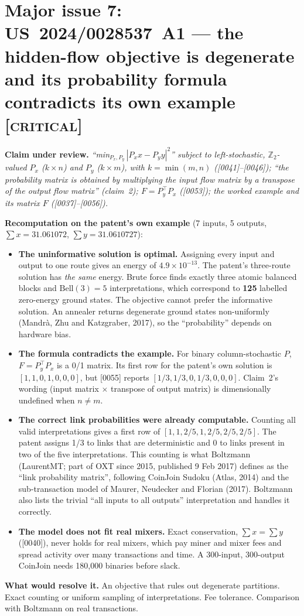 \documentclass[10pt,a4paper]{article}
\newcommand{\claim}[1]{\noindent\textbf{Claim under review.} \emph{#1}\par\smallskip}
\newcommand{\sev}[1]{\textsc{\color{BrickRed}[#1]}}
\newcommand{\req}[1]{\noindent\textbf{What would resolve it.} #1\par}
\begin{document}
\section{Major issue 7: US~2024/0028537~A1 --- the hidden-flow objective is degenerate and its probability formula contradicts its own example \sev{critical}}\label{sec:flow}
\claim{``min$_{P_x,P_y}\,|P_xx-P_yy|^2$'' subject to left-stochastic, $\mathbb{Z}_2$-valued $P_x$ ($k\times n$) and $P_y$ ($k\times m$), with $k=\min(m,n)$ ([0041]--[0046]); ``the probability matrix is obtained by multiplying the input flow matrix by a transpose of the output flow matrix'' (claim~2); $F=P_y^{\top}P_x$ ([0053]); the worked example and its matrix $F$ ([0037]--[0056]).}

\noindent\textbf{Recomputation on the patent's own example} (7 inputs, 5 outputs, $\sum x=31.061072$, $\sum y=31.0610727$):
\begin{itemize}
  \item \textbf{The uninformative solution is optimal.} Assigning every input and output to one route gives an energy of $4.9\times10^{-13}$. The patent's three-route solution has \emph{the same} energy. Brute force finds exactly three atomic balanced blocks and $\mathrm{Bell}(3)=5$ interpretations, which correspond to \textbf{125} labelled zero-energy ground states. The objective cannot prefer the informative solution. An annealer returns degenerate ground states non-uniformly (Mandr\`a, Zhu and Katzgraber, 2017), so the ``probability'' depends on hardware bias.
  \item \textbf{The formula contradicts the example.} For binary column-stochastic $P$, $F=P_y^{\top}P_x$ is a 0/1 matrix. Its first row for the patent's own solution is $[1,1,0,1,0,0,0]$, but [0055] reports $[1/3,1/3,0,1/3,0,0,0]$. Claim~2's wording (input matrix $\times$ transpose of output matrix) is dimensionally undefined when $n\neq m$.
  \item \textbf{The correct link probabilities were already computable.} Counting all valid interpretations gives a first row of $[1,1,2/5,1,2/5,2/5,2/5]$. The patent assigns 1/3 to links that are deterministic and 0 to links present in two of the five interpretations. This counting is what Boltzmann (LaurentMT; part of OXT since 2015, published 9 Feb 2017) defines as the ``link probability matrix'', following CoinJoin Sudoku (Atlas, 2014) and the sub-transaction model of Maurer, Neudecker and Florian (2017). Boltzmann also lists the trivial ``all inputs to all outputs'' interpretation and handles it correctly.
  \item \textbf{The model does not fit real mixers.} Exact conservation, $\sum x=\sum y$ ([0040]), never holds for real mixers, which pay miner and mixer fees and spread activity over many transactions and time. A 300-input, 300-output CoinJoin needs 180,000 binaries before slack.
\end{itemize}
\req{An objective that rules out degenerate partitions. Exact counting or uniform sampling of interpretations. Fee tolerance. Comparison with Boltzmann on real transactions.}
\end{document}
